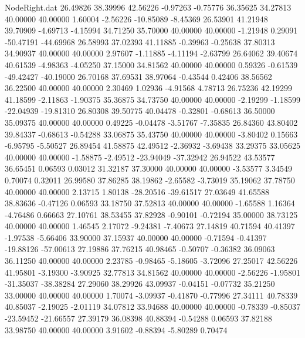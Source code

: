 \begin{filecontents}{NodeRight.dat}
  26.49826   38.39996   42.56226    -0.97263   -0.75776   36.35625   34.27813   40.00000   40.00000    1.60004   -2.56226  -10.85089   -8.45369
  26.53901   41.21948   39.70909    -4.69713   -4.15994   34.71250   35.70000   40.00000   40.00000   -1.21948    0.29091  -50.47191  -44.69968
  26.58993   37.02393   41.11885    -0.39963   -0.25638   37.80313   34.90937   40.00000   40.00000    2.97607   -1.11885   -4.11194   -2.63799
  26.64062   39.40674   40.61539    -4.98363   -4.05250   37.15000   34.81562   40.00000   40.00000    0.59326   -0.61539  -49.42427  -40.19000
  26.70168   37.69531   38.97064    -0.43544    0.42406   38.56562   36.22500   40.00000   40.00000    2.30469    1.02936   -4.91568    4.78713
  26.75236   42.19299   41.18599    -2.11863   -1.90375   35.36875   34.73750   40.00000   40.00000   -2.19299   -1.18599  -22.04939  -19.81310
  26.80308   39.50775   40.04478    -0.32801   -0.68613   36.50000   35.09375   40.00000   40.00000    0.49225   -0.04478   -3.51767   -7.35835
  26.84360   43.80402   39.84337    -0.68613   -0.54288   33.06875   35.43750   40.00000   40.00000   -3.80402    0.15663   -6.95795   -5.50527
  26.89454   41.58875   42.49512    -2.36932   -3.69438   33.29375   33.05625   40.00000   40.00000   -1.58875   -2.49512  -23.94049  -37.32942
  26.94522   43.53577   36.65451     0.06593    0.03012   31.32187   37.30000   40.00000   40.00000   -3.53577    3.34549    0.70074    0.32011
  26.99580   37.86285   38.19862    -2.65582   -3.73019   35.19062   37.78750   40.00000   40.00000    2.13715    1.80138  -28.20516  -39.61517
  27.03649   41.65588   38.83636    -0.47126    0.06593   33.18750   37.52813   40.00000   40.00000   -1.65588    1.16364   -4.76486    0.66663
  27.10761   38.53455   37.82928    -0.90101   -0.72194   35.00000   38.73125   40.00000   40.00000    1.46545    2.17072   -9.24381   -7.40673
  27.14819   40.71594   40.41397    -1.97538   -5.66406   33.90000   37.15937   40.00000   40.00000   -0.71594   -0.41397  -19.88126  -57.00613
  27.19886   37.76215   40.98465    -0.50707   -0.36382   36.09063   36.11250   40.00000   40.00000    2.23785   -0.98465   -5.18605   -3.72096
  27.25017   42.56226   41.95801    -3.19300   -3.90925   32.77813   34.81562   40.00000   40.00000   -2.56226   -1.95801  -31.35037  -38.38284
  27.29060   38.29926   43.09937    -0.04151   -0.07732   35.21250   33.00000   40.00000   40.00000    1.70074   -3.09937   -0.41870   -0.77996
  27.34111   40.78339   40.85037    -2.19025   -2.01119   34.07812   33.94688   40.00000   40.00000   -0.78339   -0.85037  -23.59452  -21.66557
  27.39179   36.08398   40.88394    -0.54288    0.06593   37.82188   33.98750   40.00000   40.00000    3.91602   -0.88394   -5.80289    0.70474

\end{filecontents}
